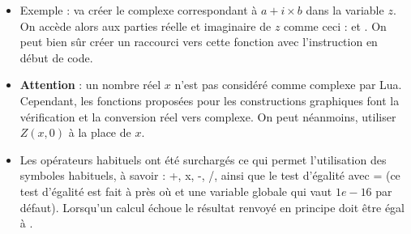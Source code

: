 \begin{itemize}
    \item Exemple :  va créer le complexe correspondant à \(a+i\times b\) dans la variable $z$. On accède alors aux parties réelle et imaginaire de $z$ comme ceci :  et . On peut bien sûr créer un raccourci vers cette fonction avec l'instruction  en début de code.
    
    \item \textbf{Attention} : un nombre réel $x$ n'est pas considéré comme complexe par Lua. Cependant, les fonctions proposées pour les constructions graphiques font la vérification et la conversion réel vers complexe. On peut néanmoins, utiliser $Z(x,0)$ à la place de $x$.
    
    \item Les opérateurs habituels ont été surchargés ce qui permet l'utilisation des symboles habituels, à savoir : +, x, -, /, ainsi que le test d'égalité avec = (ce test d'égalité est fait à  près où  et une variable globale qui vaut $1e-16$ par défaut). Lorsqu'un calcul échoue le résultat renvoyé en principe doit être égal à \nil.
    

\end{itemize}
